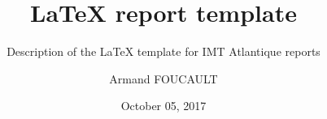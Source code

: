 \documentclass{article}
\author{Armand FOUCAULT}
\date{October 05, 2017}
\title{\LaTeX{} report template}
\subtitle{Description of the \LaTeX{} template for IMT Atlantique reports}
\begin{document}
\imtaMaketitlepage
\end{document}
